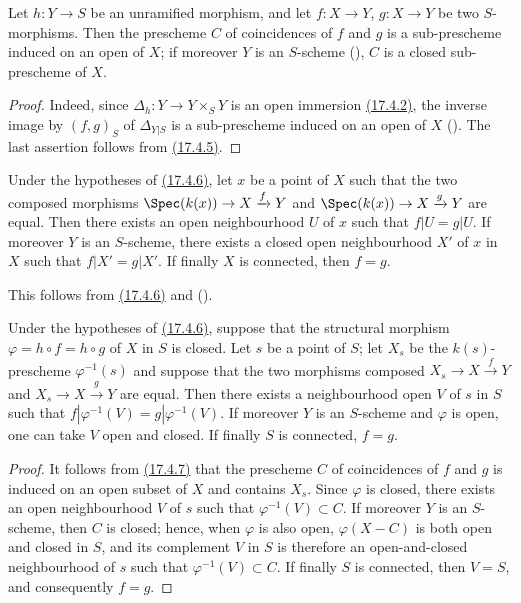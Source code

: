\begin{proposition}[17.4.6]
\label{IV.17.4.6}
Let $h:Y\to S$ be an unramified morphism, and let $f:X\to Y$, $g:X\to Y$ be two $S$-morphisms.
Then the prescheme $C$ of coincidences of $f$ and $g$ is a sub-prescheme induced on an open of $X$; if moreover $Y$ is an $S$-scheme (), $C$ is a closed sub-prescheme of $X$.
\end{proposition}

\begin{proof}
Indeed, since $\Delta_h:Y\to Y\times_S Y$ is an open immersion {\hyperlink{ega4.c04.cor.17-4-2}{(17.4.2)}}, the inverse image by $(f,g)_S$ of $\Delta_{Y|S}$ is a sub-prescheme induced on an open of $X$ ().
The last assertion follows from {\hyperlink{ega4.c04.statement.17-4-5}{(17.4.5)}}.
\end{proof}

\begin{corollary}[17.4.7]
\label{IV.17.4.7}
Under the hypotheses of {\hyperlink{ega4.c04.prop.17-4-6}{(17.4.6)}}, let $x$ be a point of $X$ such that the two composed morphisms $\Spec(k(x))\to X\xrightarrow{f} Y$ and $\Spec(k(x))\to X\xrightarrow{g} Y$ are equal.
Then there exists an open neighbourhood $U$ of $x$ such that $f|U=g|U$.
If moreover $Y$ is an $S$-scheme, there exists a closed open neighbourhood $X'$ of $x$ in $X$ such that $f|X'=g|X'$.
If finally $X$ is connected, then $f=g$.
\end{corollary}

This follows from {\hyperlink{ega4.c04.prop.17-4-6}{(17.4.6)}} and ().

\begin{corollary}[17.4.8]
\label{IV.17.4.8}
Under the hypotheses of {\hyperlink{ega4.c04.prop.17-4-6}{(17.4.6)}}, suppose that the structural morphism $\varphi=h\circ f=h\circ g$ of $X$ in $S$ is closed.
Let $s$ be a point of $S$; let $X_s$ be the $k(s)$-prescheme $\varphi^{-1}(s)$ and suppose that the two morphisms composed $X_s\to X\xrightarrow{f} Y$ and $X_s\to X\xrightarrow{g} Y$ are equal.
Then there exists a neighbourhood open $V$ of $s$ in $S$ such that $f|\varphi^{-1}(V)=g|\varphi^{-1}(V)$.
If moreover $Y$ is an $S$-scheme and $\varphi$ is open, one can take $V$ open and closed.
If finally $S$ is connected, $f=g$.
\end{corollary}

\begin{proof}
It follows from {\hyperlink{ega4.c04.cor.17-4-7}{(17.4.7)}} that the prescheme $C$ of coincidences of $f$ and $g$ is induced on an open subset of $X$ and contains $X_s$.
Since $\varphi$ is closed, there exists an open neighbourhood $V$ of $s$ such that $\varphi^{-1}(V)\subset C$.
If moreover $Y$ is an $S$-scheme, then $C$ is closed; hence, when $\varphi$ is also open, $\varphi(X-C)$ is both open and closed in $S$, and its complement $V$ in $S$ is therefore an open-and-closed neighbourhood of $s$ such that $\varphi^{-1}(V)\subset C$.
If finally $S$ is connected, then $V=S$, and consequently $f=g$.
\end{proof}

